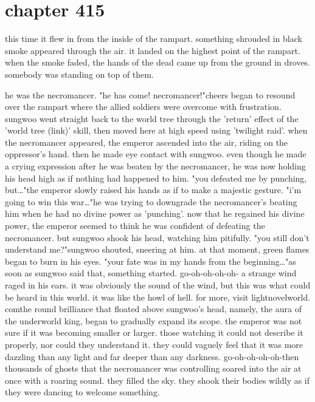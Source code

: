 \section{chapter 415}

this time it flew in from the inside of the rampart.
 something shrouded in black smoke appeared through the air.
 it landed on the highest point of the rampart.
 when the smoke faded, the hands of the dead came up from the ground in droves.
 somebody was standing on top of them.





he was the necromancer.
"he has come! necromancer!"cheers began to resound over the rampart where the allied soldiers were overcome with frustration.
 sungwoo went straight back to the world tree through the 'return' effect of the 'world tree (link)' skill, then moved here at high speed using 'twilight raid'.
when the necromancer appeared, the emperor ascended into the air, riding on the oppressor's hand.
 then he made eye contact with sungwoo.
even though he made a crying expression after he was beaten by the necromancer, he was now holding his head high as if nothing had happened to him.
"you defeated me by punching, but…"the emperor slowly raised his hands as if to make a majestic gesture.
"i'm going to win this war…"he was trying to downgrade the necromancer's beating him when he had no divine power as 'punching'.
 now that he regained his divine power, the emperor seemed to think he was confident of defeating the necromancer.
 but sungwoo shook his head, watching him pitifully.
"you still don't understand me?"sungwoo shouted, sneering at him.
 at that moment, green flames began to burn in his eyes.
"your fate was in my hands from the beginning…"as soon as sungwoo said that, something started.
go-oh-oh-oh-oh-
a strange wind raged in his ears.
 it was obviously the sound of the wind, but this was what could be heard in this world.
 it was like the howl of hell.
for more, visit lightnovelworld.
comthe round brilliance that floated above sungwoo's head, namely, the aura of the underworld king, began to gradually expand its scope.
 the emperor was not sure if it was becoming smaller or larger.
 those watching it could not describe it properly, nor could they understand it.
 they could vaguely feel that it was more dazzling than any light and far deeper than any darkness.
go-oh-oh-oh-oh-then thousands of ghosts that the necromancer was controlling soared into the air at once with a roaring sound.
 they filled the sky.
they shook their bodies wildly as if they were dancing to welcome something.
